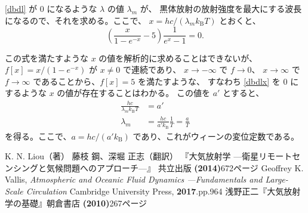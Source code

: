 \documentclass[book]{dennou777}
\begin{document}
\eqref{dbdl} が \(0\) になるような \(\lambda\) の値 \(\lambda_m\) が、
黒体放射の放射強度を最大にする波長になるので、それを求める。ここで、
\(x=hc/(\lambda_m k_\mathrm{B}T)\) とおくと、
\begin{equation}
	\left(\frac{x}{1-e^{-x}}-5\right)\frac{1}{e^x-1}=0.\label{dbdlx}
\end{equation}

この式を満たすような \(x\) の値を解析的に求めることはできないが、
\(f[x]=x/(1-e^{-x})\) が \(x\neq0\) で連続であり、 \(x\to-\infty\) で \(f\to0\)、
\(x\to\infty\) で \(f\to\infty\) であることから、\(f[x]=5\) を満たすような、
すなわち \eqref{dbdlx} を \(0\) にするような \(x\) の値が存在することはわかる。
この値を \(a'\) とすると、
\begin{align}
	\frac{hc}{\lambda_m k_\mathrm{B}T}&=a'\\
	\lambda_m&=\frac{hc}{a'k_\mathrm{B}}\frac{1}{T}=\frac{a}{T}
\end{align}
を得る。ここで、\(a=hc/(a'k_\mathrm{B})\) であり、これがウィーンの変位定数である。

\clearpage
\begin{thebibliography}{9}
	 K. N. Liou（著） 藤枝 鋼、深堀 正志（翻訳）
	『大気放射学 ---衛星リモートセンシングと気候問題へのアプローチ---』
	共立出版 \textbf{(2014)}\quad672ページ
	 Geoffrey K. Vallis,
	\textit{Atmospheric and Oceanic Fluid Dynamics ---Fundamentals and Large-Scale Circulation}
	Cambridge University Press, \textbf{2017}.\quad pp.964
	 浅野正二『大気放射学の基礎』朝倉書店 \textbf{(2010)}\quad267ページ
\end{thebibliography}

\pagebreak
\listoffigures
\listoftables
\end{document}

